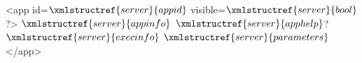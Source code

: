 <app id=$\xmlstructref{server}{appid}$ visible=$\xmlstructref{server}{bool}$?>
  $\xmlstructref{server}{appinfo}$
  $\xmlstructref{server}{apphelp}$?
  $\xmlstructref{server}{execinfo}$
  $\xmlstructref{server}{parameters}$
</app>
